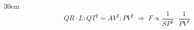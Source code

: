\documentclass[border=4pt]{standalone}
\begin{document}
\begin{varwidth}{30em}
\large
\[ QR\cdot L : QT^2 = AV^2 : PV^2 \;\Rightarrow\; F \propto \dfrac{1}{SP^2}\cdot\dfrac{1}{PV^3} \]

\end{varwidth}
\end{document}
